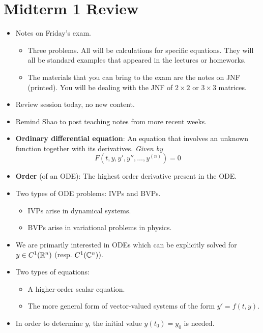 \documentclass[../notes.tex]{subfiles}
\begin{document}
\section{Midterm 1 Review}
\begin{itemize}
    \item {}Notes on Friday's exam.
    \begin{itemize}
        \item Three problems. All will be calculations for specific equations. They will all be standard examples that appeared in the lectures or homeworks.
        \item The materials that you can bring to the exam are the notes on JNF (printed). You will be dealing with the JNF of $2\times 2$ or $3\times 3$ matrices.
    \end{itemize}
    \item Review session today, no new content.
    \item Remind Shao to post teaching notes from more recent weeks.
    \item \textbf{Ordinary differential equation}: An equation that involves an unknown function together with its derivatives. \emph{Given by}
    \begin{equation*}
        F(t,y,y',y'',\dots,y^{(n)}) = 0
    \end{equation*}
    \item \textbf{Order} (of an ODE): The highest order derivative present in the ODE.
    \item Two types of ODE problems: IVPs and BVPs.
    \begin{itemize}
        \item IVPs arise in dynamical systems.
        \item BVPs arise in variational problems in physics.
    \end{itemize}
    \item We are primarily interested in ODEs which can be explicitly solved for $y\in C^1(\mathbb{R}^n)$ (resp. $C^1(\mathbb{C}^n)$).
    \item Two types of equations:
    \begin{itemize}
        \item A higher-order scalar equation.
        \item The more general form of vector-valued systems of the form $y'=f(t,y)$.
    \end{itemize}
    \item In order to determine $y$, the initial value $y(t_0)=y_0$ is needed.

\end{itemize}
\end{document}
